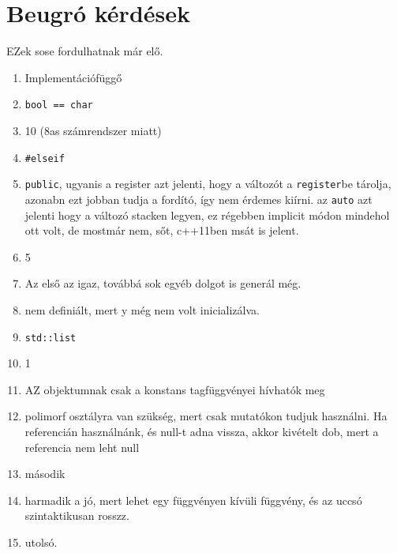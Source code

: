\documentclass[a4paper,11.5pt]{article}
\begin{document}
	\section{Beugró kérdések}
	EZek sose fordulhatnak már elő.
	\begin{enumerate}
		\item Implementációfüggő
		\item \texttt{bool == char}
		\item 10 (8as számrendszer miatt)
		\item \texttt{\#elseif}
		\item \texttt{public}, ugyanis a register azt jelenti, hogy a változót a \texttt{register}be tárolja, azonabn ezt jobban tudja a fordító, így nem érdemes kiírni. az \texttt{auto} azt jelenti hogy a változó stacken legyen, ez régebben implicit módon mindehol ott volt, de mostmár nem, sőt, c++11ben msát is jelent.
		\item 5
		\item Az első az igaz, továbbá sok egyéb dolgot is generál még.
		\item nem definiált, mert y még nem volt inicializálva.
		\item \texttt{std::list}
		\item 1
		\item AZ objektumnak csak a konstans tagfüggvényei hívhatók meg
		\item polimorf osztályra van szükség, mert csak mutatókon tudjuk használni. Ha referencián használnánk, és null-t adna vissza, akkor kivételt dob, mert a referencia nem leht null
		\item második
		\item harmadik a jó, mert lehet egy függvényen kívüli függvény, és az uccsó szintaktikusan rosszz.
		\item utolsó.
	\end{enumerate}
\end{document}
